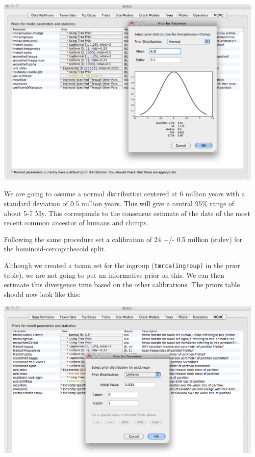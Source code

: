\documentclass[12pt]{article}
\begin{document}
\includegraphics[scale=0.4]{figures/BEAUti_Prior1}

\medskip{}

We are going to assume a normal distribution centered at 6 million
years with a standard deviation of 0.5 million years. This will give
a central 95\% range of about 5-7 My. This corresponds to the consensus
estimate of the date of the most recent common ancestor of humans and chimps.


Following the same procedure set a calibration of 24 +/- 0.5 million (stdev) for the hominoid-cercopithecoid split. 

Although we created a taxon set for the ingroup (\texttt{tmrca(ingroup)}
in the prior table), we are not going to put an informative prior
on this. We can then estimate this divergence time based on the other calibrations. The priors table should now look like this: 

\medskip{}

\includegraphics[scale=0.4]{figures/BEAUti_Prior2}
\end{document}

